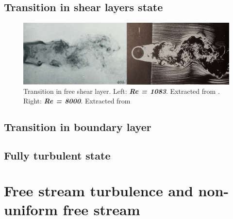 \documentclass[journal]{new-aiaa}
\begin{document}
\subsection{Transition in shear layers state}

\begin{figure}[H]
\begin{center}
\includegraphics[width=1\textwidth]{Images/federico/Figure05}
\caption{Transition in free shear layer. Left: \textbf{\textit{Re = 1083}}. Extracted from \cite{Gerrard1978}. Right: \textbf{\textit{Re = 8000}}. Extracted from \cite{Zdravkovich1997}}
\label{fig:TrSL}
\end{center}
\end{figure}

\subsection{Transition in boundary layer}

\subsection{Fully turbulent state}


\section{Free stream turbulence and non-uniform free stream}
\end{document}
